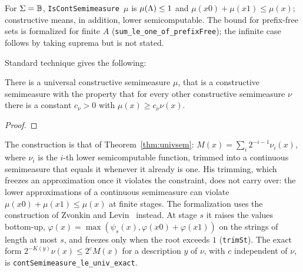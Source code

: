 \begin{formalization}
For \( \Sigma = \mathbb{B} \), \texttt{IsContSemimeasure \( \mu \)} is \( \mu(\Lambda) \le 1 \) and
\( \mu(x0) + \mu(x1) \le \mu(x) \); constructive means, in addition, lower semicomputable.
The bound for prefix-free sets is formalized for finite \( A \)
(\texttt{sum\_le\_one\_of\_prefixFree}); the infinite case follows by taking suprema but is
not stated.
\end{formalization}

Standard technique gives the following:

\begin{theorem}
  \label{thm:g2.3.5}
  \leanok
  There is a universal constructive semimeasure \( \mu \), that is a
constructive semimeasure with the property that for every other constructive
semimeasure \( \nu \) there is a constant \( c_{\nu}>0 \) with
\( \mu(x)\ge c_{\nu}\nu(x) \).
\end{theorem}

\begin{proof}
  \leanok
\end{proof}

\begin{formalization}
The construction is that of Theorem~\ref{thm:univsem}:
\( M(x) = \sum_{i} 2^{-i-1} \nu_{i}(x) \), where \( \nu_{i} \) is the \( i \)-th lower
semicomputable function, trimmed into a continuous semimeasure that equals it whenever it
already is one. His trimming, which freezes an approximation once it violates the
constraint, does not carry over: the lower approximations of a continuous semimeasure can
violate \( \mu(x0) + \mu(x1) \le \mu(x) \) at finite stages. The formalization uses the
construction of Zvonkin and Levin~\cite{ZvLe70} instead. At stage \( s \) it raises the
values bottom-up, \( \varphi(x) = \max(\psi_{s}(x), \varphi(x0) + \varphi(x1)) \) on the
strings of length at most \( s \), and freezes only when the root exceeds \( 1 \)
(\texttt{trimSt}). The exact form \( 2^{-K(y)} \nu(x) \le 2^{c} M(x) \) for a description
\( y \) of \( \nu \), with \( c \) independent of \( \nu \), is
\texttt{contSemimeasure\_le\_univ\_exact}.
\end{formalization}

